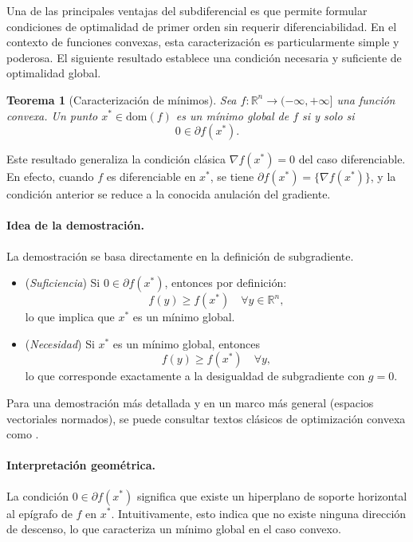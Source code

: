 \documentclass[12pt]{book}
\newtheorem{theorem}{Teorema}
\theoremstyle{definition}
\theoremstyle{plain}
\theoremstyle{remark}
\begin{document}
Una de las principales ventajas del subdiferencial es que permite formular condiciones de optimalidad de primer orden sin requerir diferenciabilidad. En el contexto de funciones convexas, esta caracterización es particularmente simple y poderosa.
%
El siguiente resultado establece una condición necesaria y suficiente de optimalidad global.

\begin{theorem}[Caracterización de mínimos]
Sea \( f: \mathbb{R}^n \to (-\infty, +\infty] \) una función convexa. Un punto \( x^* \in \mathrm{dom}(f) \) es un mínimo global de \( f \) si y solo si
\[
0 \in \partial f(x^*).
\]
\end{theorem}

Este resultado generaliza la condición clásica \( \nabla f(x^*) = 0 \) del caso diferenciable. En efecto, cuando \( f \) es diferenciable en \( x^* \), se tiene \( \partial f(x^*) = \{\nabla f(x^*)\} \), y la condición anterior se reduce a la conocida anulación del gradiente.

\paragraph{Idea de la demostración.}
La demostración se basa directamente en la definición de subgradiente.
\begin{itemize}
    \item (\emph{Suficiencia}) Si \( 0 \in \partial f(x^*) \), entonces por definición:
    \[
    f(y) \geq f(x^*) \quad \forall y \in \mathbb{R}^n,
    \]
    lo que implica que \( x^* \) es un mínimo global.
    \item (\emph{Necesidad}) Si \( x^* \) es un mínimo global, entonces
    \[
    f(y) \geq f(x^*) \quad \forall y,
    \]
    lo que corresponde exactamente a la desigualdad de subgradiente con \( g = 0 \).
\end{itemize}

Para una demostración más detallada y en un marco más general (espacios vectoriales normados), se puede consultar textos clásicos de optimización convexa como \cite{hiriart2001}. %

\paragraph{Interpretación geométrica.}
La condición \( 0 \in \partial f(x^*) \) significa que existe un hiperplano de soporte horizontal al epígrafo de \( f \) en \( x^* \). Intuitivamente, esto indica que no existe ninguna dirección de descenso, lo que caracteriza un mínimo global en el caso convexo.
\end{document}
